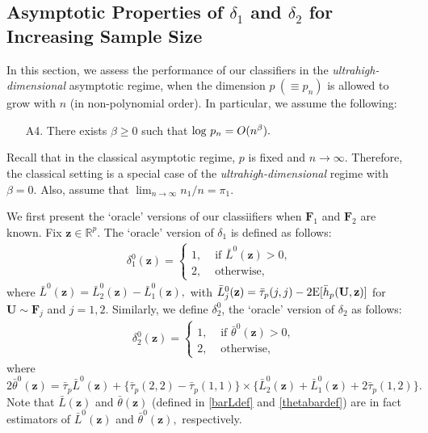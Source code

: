 \documentclass[twoside]{article}
\def\log{\hbox{log}}
\newcommand{\bF}{\mathbf{F}}
\newcommand{\bU}{\mathbf{U}}
\newcommand{\bz}{\mathbf{z}}
\newcommand{\0}{\mathbf{0}}
\newcommand{\1}{\mathbf{1}}
\numberwithin{equation}{section}
\begin{document}
\subsection{Asymptotic Properties of $\delta_1$ and $\delta_2$ for Increasing Sample Size}\label{asym.uh}
In this section, we assess the performance of our classifiers in the {\it ultrahigh-dimensional} asymptotic regime, when the dimension $p\ (\equiv p_n)$ is allowed to grow with $n$ (in non-polynomial order). In particular, we assume the following:
\begin{enumerate}
 \item[A4.] There exists $\beta\ge 0$ such that $\log \ p_n=O(n^\beta).$
\end{enumerate}
Recall that in the classical asymptotic regime, $p$ is fixed and $n\to\infty$. Therefore, the classical setting is a special case of the \emph{ultrahigh-dimensional} regime with $\beta=0$. Also, assume that $\lim_{n\to\infty} n_1/n=\pi_1$.

We first present the `oracle' versions of our classiifiers when $\bF_1$ and $\bF_2$ are known. Fix $\bz\in\mathbb{R}^p.$ The `oracle' version of $\delta_1$ is defined as follows:
\begin{align}\label{oracle1def}
 \delta^0_1(\bz)=\begin{cases}
                1,& \text{ if }\bar{L}^0(\bz)>0,\\
                2,& \text{ otherwise,}
               \end{cases}
\end{align}
where $\bar{L}^0(\bz)=\bar{L}^0_2(\bz)-\bar{L}^0_1(\bz),$ with $\bar{L}^0_j(\bz) = \bar{\tau}_p(j,j) - 2{\rm E}[\bar{h}_p(\bU,\bz)]$ for $\bU\sim\bF_j$ and $ j=1,2.$ Similarly, we define $\delta^0_2$, the `oracle' version of $\delta_2$ as follows:
\begin{align}\label{oracle2def}
 &\delta^0_2(\bz)=\begin{cases}
                1,& \text{ if }\bar{\theta}^0(\bz)>0,\\
                2,& \text{ otherwise,}
               \end{cases}
\end{align}
where $2\bar{\theta}^0(\bz) =\bar{\tau}_p\bar{L}^0(\bz)+ \big\{\bar{\tau}_p(2,2)-\bar{\tau}_p(1,1)\big\} \times \big\{\bar{L}^0_2(\bz)+\bar{L}^0_1(\bz)+2\bar{\tau}_p(1,2)\big \}.\nonumber$ Note that $\bar{L}(\bz)$ and $\bar{\theta}(\bz)$ (defined in \eqref{barLdef} and \eqref{thetabardef}) are in fact estimators of $\bar{L}^0(\bz)$ and $\bar{\theta}^0(\bz),$ respectively. %
\end{document}
